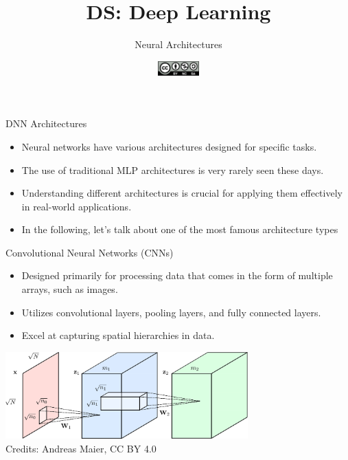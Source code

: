 \documentclass[aspectratio=169]{../latex_main/tntbeamer}  %
\title[DL: Neural Architectures]{DS: Deep Learning}
\subtitle{Neural Architectures}
\date{\hspace{0.5em} {\includegraphics[height=1.5em]{../latex_main/figures/Cc-by-nc-sa_icon.svg.png}}}
\begin{document}
	
	\maketitle
    	\begin{frame}{DNN Architectures}

            \begin{itemize}
                \item Neural networks have various architectures designed for specific tasks.
                \item The use of traditional MLP architectures is very rarely seen these days.
                \item Understanding different architectures is crucial for applying them effectively in real-world applications.
                \medskip
                \item In the following, let's talk about one of the most famous architecture types
            \end{itemize}
    
                    
    	\end{frame}

        \begin{frame}{Convolutional Neural Networks (CNNs)}
        \begin{itemize}
            \item Designed primarily for processing data that comes in the form of multiple arrays, such as images.
            \item Utilizes convolutional layers, pooling layers, and fully connected layers.
            \item Excel at capturing spatial hierarchies in data.
        \end{itemize}
        \centering
        \includegraphics[width=0.7\textwidth]{figures/conv.png}\\
        Credits: Andreas Maier, CC BY 4.0
        \end{frame}
\end{document}
